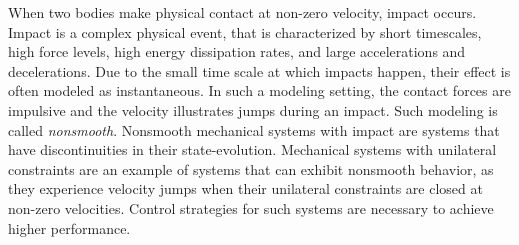 \documentclass[../DC2017114Bouma.tex]{subfiles}
\begin{document}
When two bodies make physical contact at non-zero velocity, impact occurs. Impact is a complex physical event, that is characterized by short timescales, high force levels, high energy dissipation rates, and large accelerations and decelerations. Due to the small time scale at which impacts happen, their effect is often modeled as instantaneous. In such a modeling setting, the contact forces are impulsive and the velocity illustrates jumps during an impact. Such modeling is called \textit{nonsmooth}. Nonsmooth mechanical systems with impact are systems that have discontinuities in their state-evolution. Mechanical systems with unilateral constraints are an example of systems that can exhibit nonsmooth behavior, as they experience velocity jumps when their unilateral constraints are closed at non-zero velocities. Control strategies for such systems are necessary to achieve higher performance.
\end{document}
